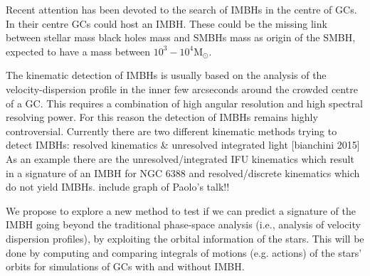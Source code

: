 \par Recent attention has been devoted to the search of \ac{IMBHs} in the centre of \ac{GCs}. In their centre \ac{GCs} could host an \ac{IMBH}. These could be the missing link between stellar mass black holes \color{red} mass \color{black} and \ac{SMBHs} \color{red} mass \color{black} as origin of the \ac{SMBH}, expected to have a mass between \(10^3-10^4 \mathrm{M}_\odot\). \par The kinematic detection of \ac{IMBHs} is usually based on the analysis of the velocity-dispersion profile in the inner few arcseconds around the crowded centre of a \ac{GC}. This requires a combination of high angular resolution and high spectral resolving power. For this reason the detection of \ac{IMBHs} remains highly controversial. Currently there are two different kinematic methods trying to detect \ac{IMBHs}: \color{red} resolved kinematics \& unresolved integrated light [bianchini 2015] \color{black} As an example there are the unresolved/integrated IFU kinematics which result in a signature of an \ac{IMBH} for NGC 6388 and resolved/discrete kinematics which do not yield \ac{IMBHs}. \color{red} include graph of Paolo's talk!! \color{black} \par We propose to explore a new method to test if we can predict a signature of the \ac{IMBH} going beyond the traditional phase-space analysis (i.e., analysis of velocity dispersion profiles), by exploiting the orbital information of the stars. This will be done by computing and comparing integrals of motions (e.g. actions) of the stars' orbits for simulations of \ac{GCs} with and without \ac{IMBH}.


